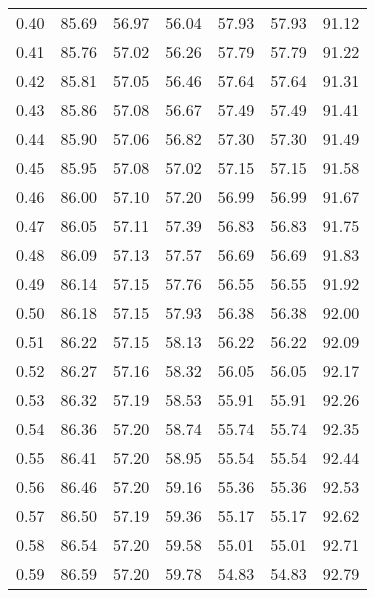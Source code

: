 \begin{tabular}{|c|c|c|c|c|c|c|}
      0.40 &     85.69 &     56.97 &      56.04 &   57.93 &      57.93 &         91.12 \\
      0.41 &     85.76 &     57.02 &      56.26 &   57.79 &      57.79 &         91.22 \\
      0.42 &     85.81 &     57.05 &      56.46 &   57.64 &      57.64 &         91.31 \\
      0.43 &     85.86 &     57.08 &      56.67 &   57.49 &      57.49 &         91.41 \\
      0.44 &     85.90 &     57.06 &      56.82 &   57.30 &      57.30 &         91.49 \\
      0.45 &     85.95 &     57.08 &      57.02 &   57.15 &      57.15 &         91.58 \\
      0.46 &     86.00 &     57.10 &      57.20 &   56.99 &      56.99 &         91.67 \\
      0.47 &     86.05 &     57.11 &      57.39 &   56.83 &      56.83 &         91.75 \\
      0.48 &     86.09 &     57.13 &      57.57 &   56.69 &      56.69 &         91.83 \\
      0.49 &     86.14 &     57.15 &      57.76 &   56.55 &      56.55 &         91.92 \\
      0.50 &     86.18 &     57.15 &      57.93 &   56.38 &      56.38 &         92.00 \\
      0.51 &     86.22 &     57.15 &      58.13 &   56.22 &      56.22 &         92.09 \\
      0.52 &     86.27 &     57.16 &      58.32 &   56.05 &      56.05 &         92.17 \\
      0.53 &     86.32 &     57.19 &      58.53 &   55.91 &      55.91 &         92.26 \\
      0.54 &     86.36 &     57.20 &      58.74 &   55.74 &      55.74 &         92.35 \\
      0.55 &     86.41 &     57.20 &      58.95 &   55.54 &      55.54 &         92.44 \\
      0.56 &     86.46 &     57.20 &      59.16 &   55.36 &      55.36 &         92.53 \\
      0.57 &     86.50 &     57.19 &      59.36 &   55.17 &      55.17 &         92.62 \\
      0.58 &     86.54 &     57.20 &      59.58 &   55.01 &      55.01 &         92.71 \\
      0.59 &     86.59 &     57.20 &      59.78 &   54.83 &      54.83 &         92.79 \\

\end{tabular}
